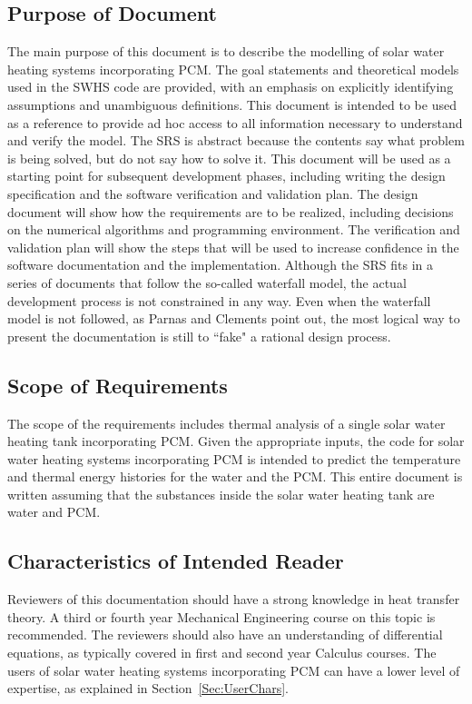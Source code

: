 \documentclass[12pt]{article}
\begin{document}
\subsection{Purpose of Document}
\label{Sec:DocPurpose}
The main purpose of this document is to describe the modelling of solar water heating systems incorporating PCM. The goal statements and theoretical models used in the SWHS code are provided, with an emphasis on explicitly identifying assumptions and unambiguous definitions. This document is intended to be used as a reference to provide ad hoc access to all information necessary to understand and verify the model. The SRS is abstract because the contents say what problem is being solved, but do not say how to solve it.
This document will be used as a starting point for subsequent development phases, including writing the design specification and the software verification and validation plan. The design document will show how the requirements are to be realized, including decisions on the numerical algorithms and programming environment. The verification and validation plan will show the steps that will be used to increase confidence in the software documentation and the implementation. Although the SRS fits in a series of documents that follow the so-called waterfall model, the actual development process is not constrained in any way. Even when the waterfall model is not followed, as Parnas and Clements point out, the most logical way to present the documentation is still to ``fake" a rational design process.
\subsection{Scope of Requirements}
\label{Sec:ReqsScope}
The scope of the requirements includes thermal analysis of a single solar water heating tank incorporating PCM. Given the appropriate inputs, the code for solar water heating systems incorporating PCM is intended to predict the temperature and thermal energy histories for the water and the PCM. This entire document is written assuming that the substances inside the solar water heating tank are water and PCM.
\subsection{Characteristics of Intended Reader}
\label{Sec:ReaderChars}
Reviewers of this documentation should have a strong knowledge in heat transfer theory. A third or fourth year Mechanical Engineering course on this topic is recommended. The reviewers should also have an understanding of differential equations, as typically covered in first and second year Calculus courses. The users of solar water heating systems incorporating PCM can have a lower level of expertise, as explained in Section~\ref{Sec:UserChars}.
\end{document}
